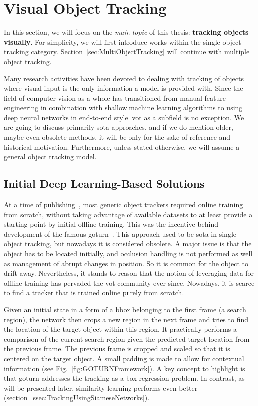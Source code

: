 \section{Visual Object Tracking}
\label{sec:VisualObjectTracking}

In this section, we will focus on the \emph{main topic} of this thesis: \textbf{tracking objects visually}. For simplicity, we will first introduce works within the single object tracking category. Section~\ref{sec:MultiObjectTracking} will continue with multiple object tracking.

Many research activities have been devoted to dealing with tracking of objects where visual input is the only information a model is provided with. Since the field of computer vision as a whole has transitioned from manual feature engineering in combination with shallow machine learning algorithms to using deep neural networks in end-to-end style, \gls{vot} as a subfield is no exception. We are going to discuss primarily \gls{sota} approaches, and if we do mention older, maybe even obsolete methods, it will be only for the sake of reference and historical motivation. Furthermore, unless stated otherwise, we will assume a general object tracking model.

\subsection{Initial Deep Learning-Based Solutions}
\label{ssec:InitialDeepLearningBasedSolutions}

At a time of publishing~\cite{held2016goturn}, most generic object trackers required online training from scratch, without taking advantage of available datasets to at least provide a starting point by initial offline training. This was the incentive behind development of the famous \gls{goturn}~\cite{held2016goturn}. This approach used to be \gls{sota} in single object tracking, but nowadays it is considered obsolete. A major issue is that the object has to be located initially, and occlusion handling is not performed as well as management of abrupt changes in position. So it is common for the object to drift away. Nevertheless, it stands to reason that the notion of leveraging data for offline training has pervaded the \gls{vot} community ever since. Nowadays, it is scarce to find a tracker that is trained online purely from scratch.

Given an initial state in a form of a \gls{bbox} belonging to the first frame (a search region), the network then crops a new region in the next frame and tries to find the location of the target object within this region. It practically performs a comparison of the current search region given the predicted target location from the previous frame. The previous frame is cropped and scaled so that it is centered on the target object. A small padding is made to allow for contextual information (see Fig.~\ref{fig:GOTURNFramework}). A key concept to highlight is that \gls{goturn} addresses the tracking as a box regression problem. In contrast, as will be presented later, similarity learning performs even better (section~\ref{ssec:TrackingUsingSiameseNetworks}).

